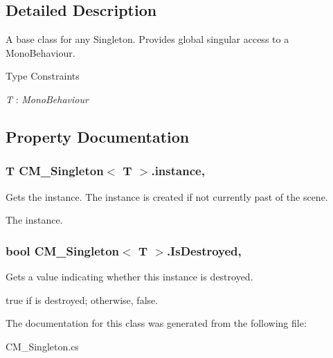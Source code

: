 \subsection{Detailed Description}
A base class for any Singleton. Provides global singular access to a Mono\+Behaviour. 

\begin{Desc}
\item[Type Constraints]\begin{description}
\item[{\em T} : {\em Mono\+Behaviour}]\end{description}
\end{Desc}


\subsection{Property Documentation}
\hypertarget{class_c_m___singleton_af2377c7977dd169962d9b76dc0fb2f45}{}
\subsubsection[{instance}]{\setlength{\rightskip}{0pt plus 5cm}T {\bf C\+M\+\_\+\+Singleton}$<$ T $>$.instance\hspace{0.3cm}{\ttfamily [static]}, {\ttfamily [get]}}\label{class_c_m___singleton_af2377c7977dd169962d9b76dc0fb2f45}


Gets the instance. The instance is created if not currently past of the scene. 

The instance.\hypertarget{class_c_m___singleton_a2d488ea5c08e0b2a2bd78e3e8658f0d4}{}
\subsubsection[{Is\+Destroyed}]{\setlength{\rightskip}{0pt plus 5cm}bool {\bf C\+M\+\_\+\+Singleton}$<$ T $>$.Is\+Destroyed\hspace{0.3cm}{\ttfamily [static]}, {\ttfamily [get]}}\label{class_c_m___singleton_a2d488ea5c08e0b2a2bd78e3e8658f0d4}


Gets a value indicating whether this instance is destroyed. 

{\ttfamily true} if is destroyed; otherwise, {\ttfamily false}.

The documentation for this class was generated from the following file\+:\begin{DoxyCompactItemize}
\item 
C\+M\+\_\+\+Singleton.\+cs\end{DoxyCompactItemize}
